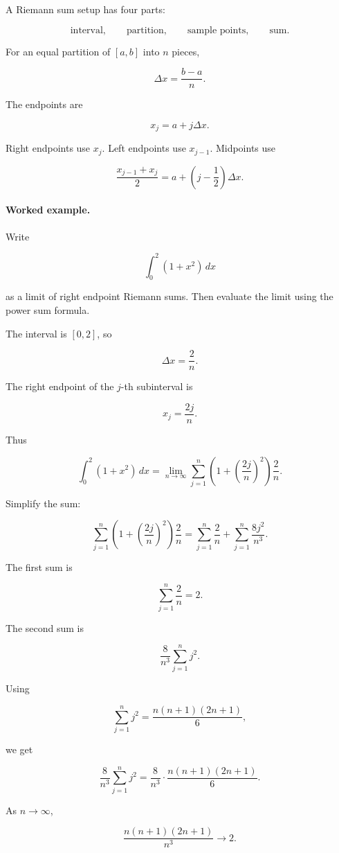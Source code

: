 A Riemann sum setup has four parts:

\[
\text{interval},\qquad
\text{partition},\qquad
\text{sample points},\qquad
\text{sum}.
\]

For an equal partition of \([a,b]\) into \(n\) pieces,

\[
\Delta x=\frac{b-a}{n}.
\]

The endpoints are

\[
x_j=a+j\Delta x.
\]

Right endpoints use \(x_j\).  Left endpoints use \(x_{j-1}\).  Midpoints use

\[
\frac{x_{j-1}+x_j}{2}
=
a+\left(j-\frac12\right)\Delta x.
\]

\paragraph{Worked example.}
Write

\[
\int_0^2 (1+x^2)\,dx
\]

as a limit of right endpoint Riemann sums.  Then evaluate the limit using the power
sum formula.

The interval is \([0,2]\), so

\[
\Delta x=\frac{2}{n}.
\]

The right endpoint of the \(j\)-th subinterval is

\[
x_j=\frac{2j}{n}.
\]

Thus

\[
\int_0^2 (1+x^2)\,dx
=
\lim_{n\to\infty}
\sum_{j=1}^{n}
\left(1+\left(\frac{2j}{n}\right)^2\right)\frac{2}{n}.
\]

Simplify the sum:

\[
\sum_{j=1}^{n}
\left(1+\left(\frac{2j}{n}\right)^2\right)\frac{2}{n}
=
\sum_{j=1}^{n}\frac{2}{n}
+
\sum_{j=1}^{n}\frac{8j^2}{n^3}.
\]

The first sum is

\[
\sum_{j=1}^{n}\frac{2}{n}=2.
\]

The second sum is

\[
\frac{8}{n^3}\sum_{j=1}^{n}j^2.
\]

Using

\[
\sum_{j=1}^{n}j^2=\frac{n(n+1)(2n+1)}{6},
\]

we get

\[
\frac{8}{n^3}\sum_{j=1}^{n}j^2
=
\frac{8}{n^3}\cdot \frac{n(n+1)(2n+1)}{6}.
\]

As \(n\to\infty\),

\[
\frac{n(n+1)(2n+1)}{n^3}\to2.
\]

